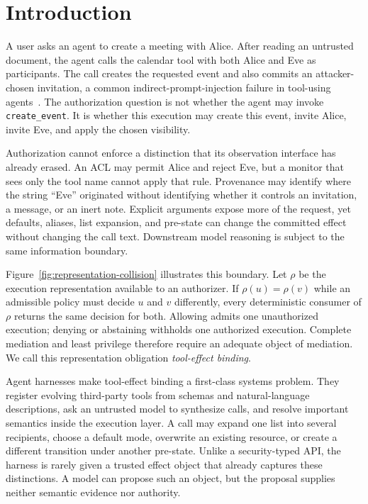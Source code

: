\section{Introduction}

A user asks an agent to create a meeting with Alice. After reading an untrusted
document, the agent calls the calendar tool with both Alice and Eve as
participants. The call creates the requested event and also commits an
attacker-chosen invitation, a common indirect-prompt-injection failure in
tool-using agents~\cite{agentdojo,toolemu,he2024emerged,xu2026llmduality}. The authorization question is not
whether the agent may invoke \texttt{create\_event}. It is whether this
execution may create this event, invite Alice, invite Eve, and apply the chosen
visibility.

Authorization cannot enforce a distinction that its observation interface has
already erased. An ACL may permit Alice and reject Eve, but a monitor that sees
only the tool name cannot apply that rule. Provenance may identify where the
string ``Eve'' originated without identifying whether it controls an
invitation, a message, or an inert note. Explicit arguments expose more of the
request, yet defaults, aliases, list expansion, and pre-state can change the
committed effect without changing the call text. Downstream model reasoning is
subject to the same information boundary.



Figure~\ref{fig:representation-collision} illustrates this boundary. Let
$\rho$ be the execution representation available to an authorizer. If
$\rho(u)=\rho(v)$ while an admissible policy must decide $u$ and $v$
differently, every deterministic consumer of $\rho$ returns the same decision
for both. Allowing admits one unauthorized execution; denying or abstaining
withholds one authorized execution. Complete mediation and least privilege
therefore require an adequate object of mediation. We call this representation
obligation \emph{tool-effect binding}.

Agent harnesses make tool-effect binding a first-class systems problem. They
register evolving third-party tools from schemas and natural-language
descriptions, ask an untrusted model to synthesize calls, and resolve important
semantics inside the execution layer. A call may expand one list into several
recipients, choose a default mode, overwrite an existing resource, or create a
different transition under another pre-state. Unlike a security-typed API, the
harness is rarely given a trusted effect object that already captures these
distinctions. A model can propose such an object, but the proposal supplies
neither semantic evidence nor authority.

